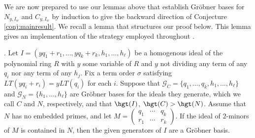 We are now prepared to use our lemmas above that establish Gr\"obner bases for $N_{y,I_w}$ and $C_{y,I_w}$ by induction to give the backward direction of Conjecture \ref{conj:mainresult}.  We recall a lemma that structures our proof below.  This lemma gives an implementation of the strategy employed throughout \cite{GMN13}.  

\begin{lemma}\label{lem:mainApp}\cite[Corollary 4.13]{KR}.  
Let $I = ( yq_1+r_1,\dots, yq_k+r_k,h_1,\dots, h_\ell )$ be a homogenous ideal of the polynomial ring $R$ with $y$ some variable of $R$ and $y$ not dividing any term of any $q_i$ nor any term of any $h_j$. Fix a term order $\sigma$ satisfying $LT(yq_i+r_i) = yLT(q_i)$ for each $i$.   Suppose that $\mathcal{G}_C = \{q_1,\dots, q_k,h_1,\dots, h_\ell\}$ and $\mathcal{G}_N = \{h_1,\dots, h_\ell\}$ are Gr\"obner bases for the ideals they generate, which we call $C$ and $N$, respectively, and that $\hgt(I)$, $\hgt(C)>\hgt(N)$.  Assume that $N$ has no embedded primes, and let $M = \begin{pmatrix}
q_1& \cdots & q_k\\
r_1& \cdots & r_k
\end{pmatrix}.$ If the ideal of $2$-minors of $M$ is contained in $N$, then the given generators of $I$ are a Gr\"obner basis.
\end{lemma}
